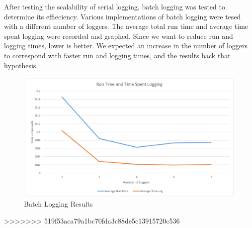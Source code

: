 After testing the scalability of serial logging, batch logging was tested to determine its effieciency. Various implementations of batch logging were tesed with a different number of loggers. The average total run time and average time spent logging were recorded and graphed. Since we want to reduce run and logging times, lower is better. We expected an increase in the number of loggers to correspond with faster run and logging times, and the results back that hypothesis.
\begin{figure}
	\caption{Batch Logging Results}
	\includegraphics[width=\textwidth]{BatchLoggingResults.png}
\end{figure}
>>>>>>> 519f53aca79a1bc70fda3c88de5c13915720c536
